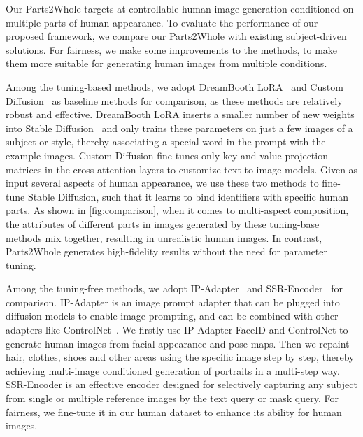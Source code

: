 Our Parts2Whole targets at controllable human image generation conditioned on multiple parts of human appearance. To evaluate the performance of our proposed framework, we compare our Parts2Whole with existing subject-driven solutions. For fairness, we make some improvements to the methods, to make them more suitable for generating human images from multiple conditions.

Among the tuning-based methods, we adopt DreamBooth LoRA~\cite{ruiz2023dreambooth,hu2021lora} and Custom Diffusion~\cite{kumari2023customdiffusion} as baseline methods for comparison, as these methods are relatively robust and effective. DreamBooth LoRA inserts a smaller number of new weights into Stable Diffusion~\cite{rombach2022ldm} and only trains these parameters on just a few images of a subject or style, thereby associating a special word in the prompt with the example images. Custom Diffusion fine-tunes only key and value projection matrices in the cross-attention layers to customize text-to-image models. Given as input several aspects of human appearance, we use these two methods to fine-tune Stable Diffusion, such that it learns to bind identifiers with specific human parts. As shown in \cref{fig:comparison}, when it comes to multi-aspect composition, the attributes of different parts in images generated by these tuning-base methods mix together, resulting in unrealistic human images. In contrast, Parts2Whole generates high-fidelity results without the need for parameter tuning.

Among the tuning-free methods, we adopt IP-Adapter~\cite{ye2023ipadapter} and SSR-Encoder~\cite{zhang2024ssrencoder} for comparison. IP-Adapter is an image prompt adapter that can be plugged into diffusion models to enable image prompting, and can be combined with other adapters like ControlNet~\cite{zhang2023controlnet}. We firstly use IP-Adapter FaceID and ControlNet to generate human images from facial appearance and pose maps. Then we repaint hair, clothes, shoes and other areas using the specific image step by step, thereby achieving multi-image conditioned generation of portraits in a multi-step way. SSR-Encoder is an effective encoder designed for selectively capturing any subject from single or multiple reference images by the text query or mask query. For fairness, we fine-tune it in our human dataset to enhance its ability for human images.

